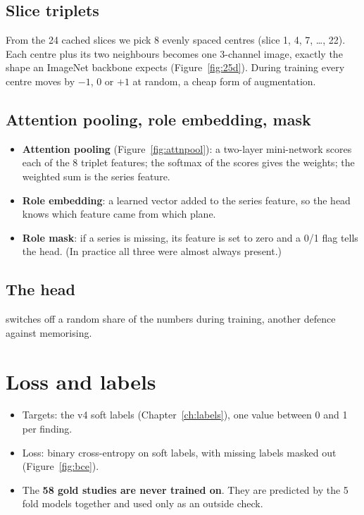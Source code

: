 \subsection*{Slice triplets}

From the 24 cached slices we pick 8 evenly spaced centres (slice 1, 4, 7, \ldots, 22). Each centre plus its two
neighbours becomes one 3-channel image, exactly the shape an ImageNet backbone expects (Figure~\ref{fig:25d}).
During training every centre moves by $-1$, 0 or $+1$ at random, a cheap form of augmentation.

\subsection*{Attention pooling, role embedding, mask}

\begin{itemize}
\item \textbf{Attention pooling} (Figure~\ref{fig:attnpool}): a two-layer mini-network scores each of the 8 triplet
      features; the softmax of the scores gives the weights; the weighted sum is the series feature.
\item \textbf{Role embedding}: a learned vector added to the series feature, so the head knows which feature came
      from which plane.
\item \textbf{Role mask}: if a series is missing, its feature is set to zero and a 0/1 flag tells the head. (In
      practice all three were almost always present.)
\end{itemize}

\subsection*{The head}

\begin{center}\small
{}
\end{center}
 switches off a random share of the numbers during training, another defence against
memorising.

\section{Loss and labels}

\begin{itemize}
\item Targets: the v4 soft labels (Chapter~\ref{ch:labels}), one value between 0 and 1 per finding.
\item Loss: binary cross-entropy on soft labels, with missing labels masked out (Figure~\ref{fig:bce}).
\item The \textbf{58 gold studies are never trained on}. They are predicted by the 5 fold models together and used
      only as an outside check.
\end{itemize}

